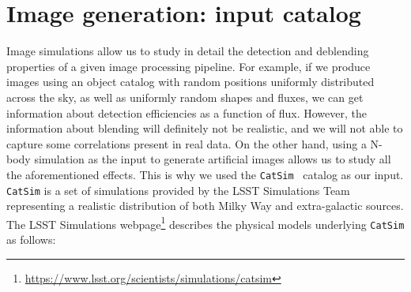 \documentclass[\docopts]{\docclass}
\begin{document}
\section{Image generation: input catalog}
\label{sec:inputs}
Image simulations allow us to study in detail the detection and deblending properties of a given image processing pipeline. For example, if we produce images using an object catalog with random positions uniformly distributed across the sky, as well as uniformly random shapes and fluxes, we can get information about detection efficiencies as a function of flux.  However, the information about blending will definitely not be realistic, and we will not able to capture some correlations present in real data. On the other hand, using a N-body simulation as the input to generate artificial images allows us to study all the aforementioned effects. This is why we used the \texttt{CatSim}~\citep{2010SPIE.7738E..1OC,2014SPIE.9150E..14C} catalog as our input.  \texttt{CatSim} is a set of simulations provided by the LSST Simulations Team representing a realistic distribution of both Milky Way and extra-galactic sources.  The LSST Simulations webpage\footnote{\url{https://www.lsst.org/scientists/simulations/catsim}} describes the physical models underlying \texttt{CatSim} as follows:
\end{document}
